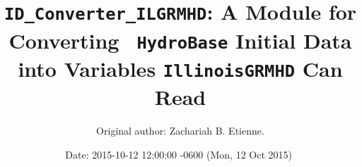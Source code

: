 \documentclass{article}
\begin{document}
\title{{\tt ID\_Converter\_ILGRMHD}: A Module for Converting {\tt
    HydroBase} Initial Data into Variables {\tt IllinoisGRMHD} Can Read}

\author{Original author: Zachariah B. Etienne. }

\date{$ $Date: 2015-10-12 12:00:00 -0600 (Mon, 12 Oct 2015) $ $}
\maketitle

%
%  
%                                                    
\end{document}
